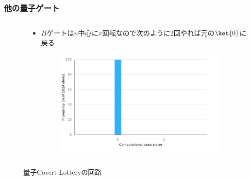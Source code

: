 \begin{frame}
  \frametitle{他の量子ゲート}

  \begin{columns}
    \begin{column}{0.4\textwidth}
      \begin{figure}
        \HGateFigure
      \end{figure}
    \end{column}
    \begin{column}{0.6\textwidth}
      \begin{itemize}
        \item $H$ゲートは$n$中心に$\pi$回転なので次のように2回やれば元の$\ket{0}$に戻る
        \begin{figure}
          \centering
        \end{figure}
        \begin{figure}
          \includegraphics[width=0.95\textwidth]{./img/hgate_hgate_histogram.pdf}
        \end{figure}
      \end{itemize}
    \end{column}
  \end{columns}
\end{frame}

\begin{frame}
  \begin{figure}
    \centering
    \caption{量子Covert Lotteryの回路}
  \end{figure}
\end{frame}

